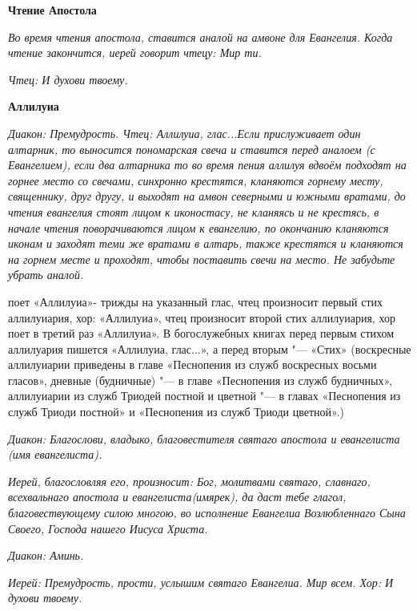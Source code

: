 \medskip\bfseries Чтение Апостола \normalfont{}\nopagebreak

\itshape Во время чтения апостола, ставится аналой на амвоне для Евангелия. Когда чтение закончится, иерей говорит чтецу:\normalfont{} Мир ти.


\itshape  Чтец:\normalfont{} И духови твоему.


\medskip\bfseries Аллилуиа \normalfont{}\nopagebreak


\itshape Диакон:\normalfont{} Премудрость.
\itshape Чтец:\normalfont{} Аллилуиа, глас...\itshape  Если прислуживает один алтарник, то выносится пономарская свеча и ставится перед аналоем (с Евангелием), если два алтарника то во время пения аллилуя вдвоём подходят на горнее место со свечами, синхронно крестятся, кланяются горнему месту, священнику, друг другу, и выходят на амвон северными и южными вратами, до чтения евангелия стоят лицом к иконостасу, не кланяясь и не крестясь, в начале чтения поворачиваются лицом к евангелию, по окончанию кланяются иконам и заходят теми же вратами в алтарь, также крестятся и кланяются на горнем месте и проходят, чтобы поставить свечи на место. Не забудьте убрать аналой.\normalfont{}


 поет «Аллилуиа»- трижды на указанный глас, чтец произносит первый стих аллилуиария, хор: «Аллилуиа», чтец произносит второй стих аллилуиария, хор поет в третий раз «Аллилуиа». В богослужебных книгах перед первым стихом аллилуария пишется «Аллилуиа, глас...», а перед вторым "--- «Стих» (воскресные аллилуиарии приведены в главе «Песнопения из служб воскресных восьми гласов», дневные (будничные) "--- в главе «Песнопения из служб будничных», аллилуиарии из служб Триодей постной и цветной "--- в главах «Песнопения из служб Триоди постной» и «Песнопения из служб Триоди цветной».)


\itshape Диакон:\normalfont{} Благослови, владыко, благовестителя святаго апостола и евангелиста \itshape (имя евангелиста)\normalfont{}.


\itshape Иерей, благословляя его, произносит:\normalfont{} Бог, молитвами святаго, славнаго, всехвальнаго апостола и евангелиста\itshape  (имярек)\normalfont{}, да даст тебе глагол, благовествующему силою многою, во исполнение Евангелиа Возлюбленнаго Сына Своего, Господа нашего Иисуса Христа.


\itshape Диакон:\normalfont{} Аминь.


\itshape Иерей:\normalfont{} Премудрость, прости, услышим святаго Евангелиа. Мир всем.
\itshape Хор:\normalfont{} И духови твоему.


